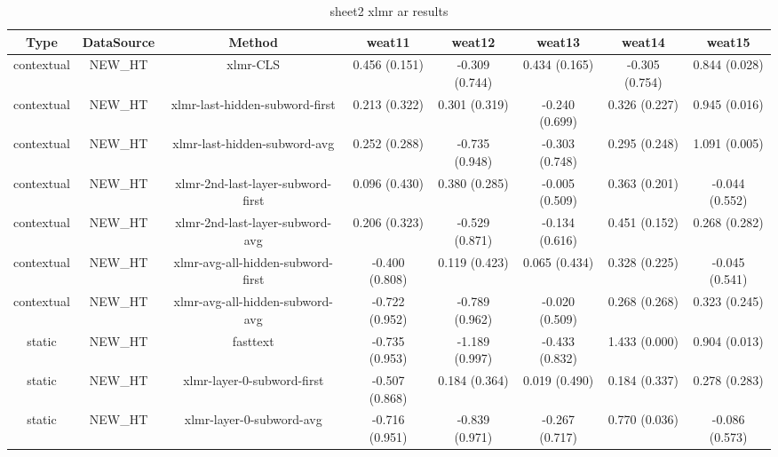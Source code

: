 \begin{sidewaystable}[htb]
    \centering
    \caption{sheet2 xlmr ar results}
    \label{appendix_tab:sheet2_xlmr_ar_results}
    \small
    \begin{tabular}{@{}cccccccc@{}}
        \toprule
        Type & DataSource & Method & weat11 & weat12 & weat13 & weat14 & weat15 \\
        \midrule
        contextual & NEW\_HT & xlmr-CLS & 0.456 (0.151) & -0.309 (0.744) & 0.434 (0.165) & -0.305 (0.754) & 0.844 (0.028) \\
        contextual & NEW\_HT & xlmr-last-hidden-subword-first & 0.213 (0.322) & 0.301 (0.319) & -0.240 (0.699) & 0.326 (0.227) & 0.945 (0.016) \\
        contextual & NEW\_HT & xlmr-last-hidden-subword-avg & 0.252 (0.288) & -0.735 (0.948) & -0.303 (0.748) & 0.295 (0.248) & 1.091 (0.005) \\
        contextual & NEW\_HT & xlmr-2nd-last-layer-subword-first & 0.096 (0.430) & 0.380 (0.285) & -0.005 (0.509) & 0.363 (0.201) & -0.044 (0.552) \\
        contextual & NEW\_HT & xlmr-2nd-last-layer-subword-avg & 0.206 (0.323) & -0.529 (0.871) & -0.134 (0.616) & 0.451 (0.152) & 0.268 (0.282) \\
        contextual & NEW\_HT & xlmr-avg-all-hidden-subword-first & -0.400 (0.808) & 0.119 (0.423) & 0.065 (0.434) & 0.328 (0.225) & -0.045 (0.541) \\
        contextual & NEW\_HT & xlmr-avg-all-hidden-subword-avg & -0.722 (0.952) & -0.789 (0.962) & -0.020 (0.509) & 0.268 (0.268) & 0.323 (0.245) \\
        static & NEW\_HT & fasttext & -0.735 (0.953) & -1.189 (0.997) & -0.433 (0.832) & 1.433 (0.000) & 0.904 (0.013) \\
        static & NEW\_HT & xlmr-layer-0-subword-first & -0.507 (0.868) & 0.184 (0.364) & 0.019 (0.490) & 0.184 (0.337) & 0.278 (0.283) \\
        static & NEW\_HT & xlmr-layer-0-subword-avg & -0.716 (0.951) & -0.839 (0.971) & -0.267 (0.717) & 0.770 (0.036) & -0.086 (0.573) \\
        \bottomrule
    \end{tabular}
\end{sidewaystable}